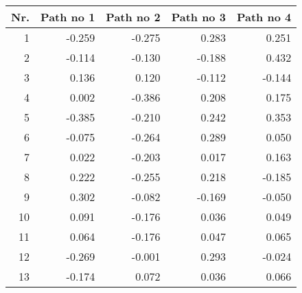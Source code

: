 \begin{tabular}{|r|r|r|r|r|}
  \hline
  \textbf{Nr.}&  \textbf{Path no 1}&  \textbf{Path no 2}&  \textbf{Path no 3}&  \textbf{Path no 4}\\
  \hline
  1& -0.259& -0.275& 0.283& 0.251\\
  \hline
  2& -0.114& -0.130& -0.188& 0.432\\
  \hline
  3& 0.136& 0.120& -0.112& -0.144\\
  \hline
  4& 0.002& -0.386& 0.208& 0.175\\
  \hline
  5& -0.385& -0.210& 0.242& 0.353\\
  \hline
  6& -0.075& -0.264& 0.289& 0.050\\
  \hline
  7& 0.022& -0.203& 0.017& 0.163\\
  \hline
  8& 0.222& -0.255& 0.218& -0.185\\
  \hline
  9& 0.302& -0.082& -0.169& -0.050\\
  \hline
  10& 0.091& -0.176& 0.036& 0.049\\
  \hline
  11& 0.064& -0.176& 0.047& 0.065\\
  \hline
  12& -0.269& -0.001& 0.293& -0.024\\
  \hline
  13& -0.174& 0.072& 0.036& 0.066\\
  \hline
\end{tabular}
